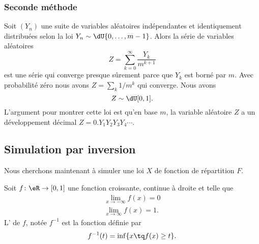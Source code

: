 \subsubsection{Seconde méthode}

Soit \( (Y_n)\) une suite de variables aléatoires indépendantes et identiquement distribuées selon la loi \( Y_n\sim\dU\{ 0,\ldots,m-1 \}\). Alors la série de variables aléatoires
\begin{equation}
    Z=\sum_{k=0}^{\infty}\frac{ Y_k }{ m^{k+1} }
\end{equation}
est une série qui converge presque sûrement parce que \( Y_k\) est borné par \( m\). Avec probabilité zéro nous avons \( Z=\sum_k1/m^k\) qui converge. Nous avons
\begin{equation}
    Z\sim\dU\mathopen[ 0 , 1 \mathclose].
\end{equation}
L'argument pour montrer cette loi est qu'en base \( m\), la variable aléatoire \( Z\) a un développement décimal \( Z=0.Y_1Y_2Y_3Y_4\cdots\).

\subsection{Simulation par inversion}

Nous cherchons maintenant à simuler une loi \( X\) de fonction de répartition \( F\).

\begin{definition}
    Soit \( f\colon \eR\to \mathopen[ 0 , 1 \mathclose]\) une fonction croissante, continue à droite et telle que
    \begin{subequations}
        \begin{align}
            \lim_{x\to -\infty} f(x)=0\\
            \lim_{x\to \infty} f(x)=1.
        \end{align}
    \end{subequations}
    L' de \( f\), notée \( f^{-1}\) est la fonction définie par
    \begin{equation}
        f^{-1}(t)=\inf\{ x\tq f(x)\geq t \}.
    \end{equation}
\end{definition}

